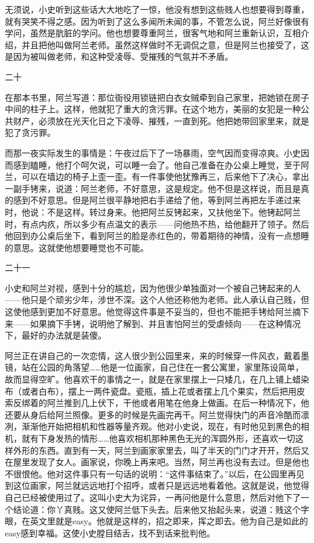 无须说，小史听到这些话大大地吃了一惊，他没有想到这些贱人也想要得到尊重，就有哭笑不得之感。因为听到了这么多闻所未闻的事，不管怎么说，阿兰好像很有学问，虽然是肮脏的学问。他也想要尊重阿兰，很客气地和阿兰重新认识，互相介绍，并且把他叫做阿兰老师。虽然这样做时不无调侃之意，但是阿兰也接受了，这是因为被叫做老师，和这种受凌辱、受摧残的气氛并不矛盾。 

二十 

在那本书里，阿兰写道：那位衙役用锁链把白衣女贼牵到自己家里，把她锁在房子中间的柱子上。这样，他就犯了重大的贪污罪。在这个地方，美丽的女犯是一种公共财产，必须放在光天化日之下凌辱、摧残，一直到死。他把她带回家里来，就是犯了贪污罪。 

而那一夜实际发生的事情是：午夜过后下了一场暴雨，空气因而变得凉爽。小史因而感到瞌睡，他打个呵欠说，可以睡一会了。他自己准备在办公桌上睡觉，至于阿兰，可以在墙边的椅子上歪一歪。有一件事使他犹豫再三，后来他下了决心，拿出一副手铐来，说道：阿兰老师，不好意思，这是规定。他不但是这样说，而且是真的感到不好意思。但是阿兰很平静地把右手递给了他，等到阿兰再把左手递过来时，他说：不是这样。转过身来。他把阿兰反铐起来，又扶他坐下。他铐起阿兰时，有点内疚，所以多少有点温文的表示——问他热不热，给他翻开了领子。然后他回到办公桌后坐下，看到阿兰的脸是赤红色的，带着期待的神情，没有一点想睡的意思。这就使他想要睡觉也不可能。 

二十一 

小史和阿兰对视，感到十分的尴尬，因为他很少单独面对一个被自己铐起来的人——他只是个顽劣少年，涉世不深。这个人他还称他为老师。此人承认自己贱，但这使他感到更加不好意思。他觉得这件事是不妥当的，但也不能把手铐给阿兰摘下来——如果摘下手铐，说明他了解到、并且害怕阿兰的受虐倾向——在这种情况下，最好的办法就是装傻。 

阿兰正在讲自己的一次恋情，这人很少到公园里来，来的时候穿一件风衣，戴着墨镜，站在公园的角落望……他是一位画家，自己住在一套公寓里，家里陈设简单，故而显得空旷。他喜欢干的事情之一，就是在家里摆上一只矮几，在几上铺上蜡染布（或者白布），摆上一两件瓷盘。瓷瓶，插上花或者摆上几个果实，然后把用皮索反绑着的阿兰推到几上伏下，干他或者用笔在他身上做画。在后一种情况下，他还要从身后给阿兰照像。更多的时候是先画完再干。阿兰觉得快门的声音冷酷而凛冽，渐渐他开始把相机和性器等量齐观。他对小史说，现在，有时他见到黑色的相机，就有下身发热的情形……他喜欢相机那种黑色无光的浑圆外形，还喜欢一切这样外形的东西。直到有一天，阿兰到画家家里去，叫了半天的门门才开开，然后又在屋里发现了女人。画家说，你晚上再来吧。当然，阿兰再也没有去过。但是他也不很恨他。他对这件事只有一句话的说明：“这件事结束了。”以后，在公园里再见到这位画家，阿兰就远远地打个招呼，或者只是远远地看着他。这就是说，他觉得自己已经被使用过了。这叫小史大为诧异，一再问他是什么意思，然后对他下了一个结论道：你丫真贱。这又使阿兰低下头去。后来他又抬起头来，说道：贱这个字眼，在英文里就是easy。他就是这样的，招之即来，挥之即去。他为自己是如此的easy感到幸福。这使小史膛目结舌，找不到话来批判他。 


